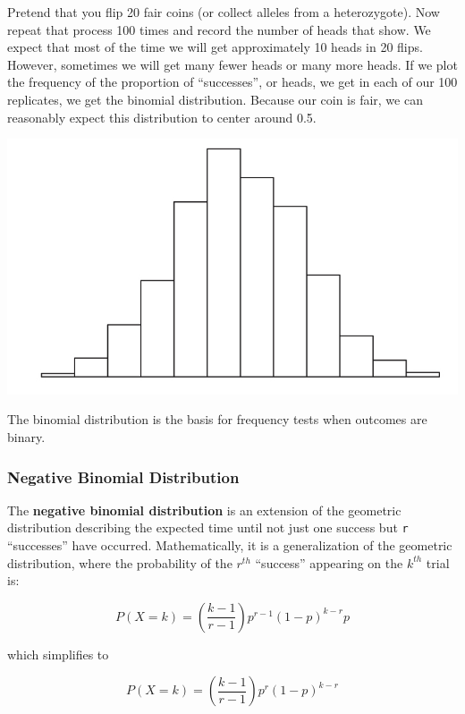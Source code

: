 \documentclass[
]{book}
\begin{document}
Pretend that you flip 20 fair coins (or collect alleles from a heterozygote). Now repeat that process 100 times and record the number of heads that show. We expect that most of the time we will get approximately 10 heads in 20 flips. However, sometimes we will get many fewer heads or many more heads. If we plot the frequency of the proportion of ``successes'', or heads, we get in each of our 100 replicates, we get the binomial distribution. Because our coin is fair, we can reasonably expect this distribution to center around 0.5.

\begin{center}\includegraphics[width=1\linewidth]{images/week_2.003} \end{center}

The binomial distribution is the basis for frequency tests when outcomes are binary.

\hypertarget{negative-binomial-distribution}{%
\subsubsection{\texorpdfstring{\textbf{Negative Binomial Distribution}}{Negative Binomial Distribution}}\label{negative-binomial-distribution}}

The \textbf{negative binomial distribution} is an extension of the geometric distribution describing the expected time until not just one success but \texttt{r} ``successes'' have occurred. Mathematically, it is a generalization of the geometric distribution, where the probability of the \(r^{th}\) ``success'' appearing on the \(k^{th}\) trial is:

\[P(X=k)=(\frac{k-1}{r-1})p^{r-1}(1-p)^{k-r}p\]

which simplifies to

\[P(X=k)=(\frac{k-1}{r-1})p^{r}(1-p)^{k-r}\]
\end{document}
